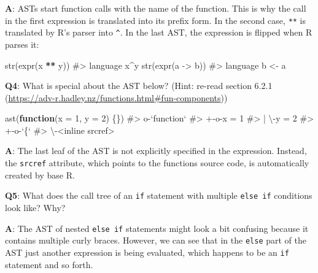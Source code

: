 \documentclass[
]{krantz}
\makeatletter
\newenvironment{Shaded}{\begin{snugshade}}{\end{snugshade}}
\newcommand{\CommentTok}[1]{\textcolor[rgb]{0.56,0.35,0.01}{\textit{#1}}}
\newcommand{\ControlFlowTok}[1]{\textcolor[rgb]{0.13,0.29,0.53}{\textbf{#1}}}
\newcommand{\DataTypeTok}[1]{\textcolor[rgb]{0.13,0.29,0.53}{#1}}
\newcommand{\DecValTok}[1]{\textcolor[rgb]{0.00,0.00,0.81}{#1}}
\newcommand{\KeywordTok}[1]{\textcolor[rgb]{0.13,0.29,0.53}{\textbf{#1}}}
\newcommand{\NormalTok}[1]{#1}
\newcommand{\OperatorTok}[1]{\textcolor[rgb]{0.81,0.36,0.00}{\textbf{#1}}}
\newcommand{\StringTok}[1]{\textcolor[rgb]{0.31,0.60,0.02}{#1}}
\renewcommand{\href}[2]{#2 (\url{#1})}
\newenvironment{kframe}{%
\medskip{}
\setlength{\fboxsep}{.8em}
 \def\at@end@of@kframe{}%
 \ifinner\ifhmode%
  \def\at@end@of@kframe{\end{minipage}}%
  \begin{minipage}{\columnwidth}%
 \fi\fi%
 \def\FrameCommand##1{\hskip\@totalleftmargin \hskip-\fboxsep
 \colorbox{shadecolor}{##1}\hskip-\fboxsep
     \hskip-\linewidth \hskip-\@totalleftmargin \hskip\columnwidth}%
 \MakeFramed {\advance\hsize-\width
   \@totalleftmargin\z@ \linewidth\hsize
   \@setminipage}}%
 {\par\unskip\endMakeFramed%
 \at@end@of@kframe}
\renewenvironment{Shaded}{\begin{kframe}}{\end{kframe}}
\renewcommand{\KeywordTok} [1]{\textcolor[rgb]{0.00,0.44,0.13}{{#1}}}
\renewcommand{\DataTypeTok}[1]{\textcolor[rgb]{0.56,0.13,0.00}{{#1}}}
\renewcommand{\DecValTok}  [1]{\textcolor[rgb]{0.25,0.63,0.44}{{#1}}}
\renewcommand{\StringTok}  [1]{\textcolor[rgb]{0.25,0.44,0.63}{{#1}}}
\renewcommand{\CommentTok} [1]{\textcolor[rgb]{0.38,0.63,0.69}{{#1}}}
\renewcommand{\NormalTok}  [1]{{#1}}
\makeatother
\begin{document}
\textbf{{A}}: ASTs start function calls with the name of the function. This is why the call in the first expression is translated into its prefix form. In the second case, \texttt{**} is translated by R's parser into \texttt{\^{}}. In the last AST, the expression is flipped when R parses it:

\begin{Shaded}
\begin{Highlighting}[]
\KeywordTok{str}\NormalTok{(}\KeywordTok{expr}\NormalTok{(x }\OperatorTok{**}\StringTok{ }\NormalTok{y))}
\CommentTok{#>  language x^y}
\KeywordTok{str}\NormalTok{(}\KeywordTok{expr}\NormalTok{(a ->}\StringTok{ }\NormalTok{b))}
\CommentTok{#>  language b <- a}
\end{Highlighting}
\end{Shaded}

\textbf{{Q4}}: What is special about the AST below? (Hint: re-read section \href{https://adv-r.hadley.nz/functions.html\#fun-components}{6.2.1})

\begin{Shaded}
\begin{Highlighting}[]
\KeywordTok{ast}\NormalTok{(}\ControlFlowTok{function}\NormalTok{(}\DataTypeTok{x =} \DecValTok{1}\NormalTok{, }\DataTypeTok{y =} \DecValTok{2}\NormalTok{) \{\})}
\CommentTok{#> o-`function` }
\CommentTok{#> +-o-x = 1 }
\CommentTok{#> | \textbackslash{}-y = 2 }
\CommentTok{#> +-o-`\{` }
\CommentTok{#> \textbackslash{}-<inline srcref>}
\end{Highlighting}
\end{Shaded}

\textbf{{A}}: The last leaf of the AST is not explicitly specified in the expression. Instead, the \texttt{srcref} attribute, which points to the functions source code, is automatically created by base R.

\textbf{{Q5}}: What does the call tree of an \texttt{if} statement with multiple \texttt{else\ if} conditions look like? Why?

\textbf{{A}}: The AST of nested \texttt{else\ if} statements might look a bit confusing because it contains multiple curly braces. However, we can see that in the \texttt{else} part of the AST just another expression is being evaluated, which happens to be an \texttt{if} statement and so forth.
\end{document}
